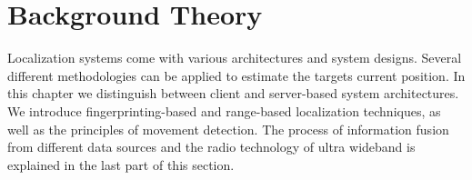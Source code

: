 
\chapter{Background Theory} %

\label{Chapter3} %
Localization systems come with various architectures and system designs. Several different methodologies can be applied to estimate the targets current position. In this chapter we distinguish between client and server-based system architectures. We introduce fingerprinting-based and range-based localization techniques, as well as the principles of movement detection. The process of information fusion from different data sources and the radio technology of ultra wideband is explained in the last part of this section.

